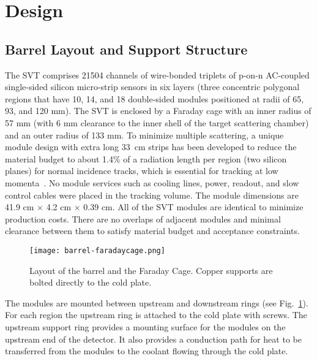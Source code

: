 \section{Design}

\subsection{Barrel Layout and Support Structure}

The SVT comprises 21504 channels of wire-bonded triplets of p-on-n AC-coupled single-sided silicon micro-strip sensors in six layers (three concentric polygonal regions that have 10, 14, and 18 double-sided modules positioned at radii of 65, 93, and 120 mm). The SVT is enclosed by a Faraday cage with an inner radius of 57 mm (with 6 mm clearance to the inner shell of the target scattering chamber) and an outer radius of 133 mm. To minimize multiple scattering, a unique module design with extra long 33~cm strips has been developed to reduce the material budget to about 1.4$\%$ of a radiation length per region (two silicon planes) for normal incidence tracks, which is essential for tracking at low momenta~\cite{Vertex2016}. No module services such as cooling lines, power, readout, and slow control cables were placed in the tracking volume. The module dimensions are 41.9 cm $\times$ 4.2 cm $\times$ 0.39 cm. All of the SVT modules are identical to minimize production costs. There are no overlaps of adjacent modules and minimal clearance between them to satisfy material budget and acceptance constraints.

\begin{figure}[hbt] 
\centering 
\texttt{[image: barrel-faradaycage.png]}
\caption{Layout of the barrel and the Faraday Cage. Copper supports are bolted directly to the cold plate.}
\label{fig:barrel-faradaycage}
\end{figure}



The modules  are mounted between upstream and downstream rings (see Fig.~\ref{fig:barrel-faradaycage}). For each region the upstream ring is attached to the cold plate with screws. The upstream support ring provides a mounting surface for the modules on the upstream end of the detector. It also provides a conduction path for heat to be transferred from the modules to the coolant flowing through the cold plate. 

